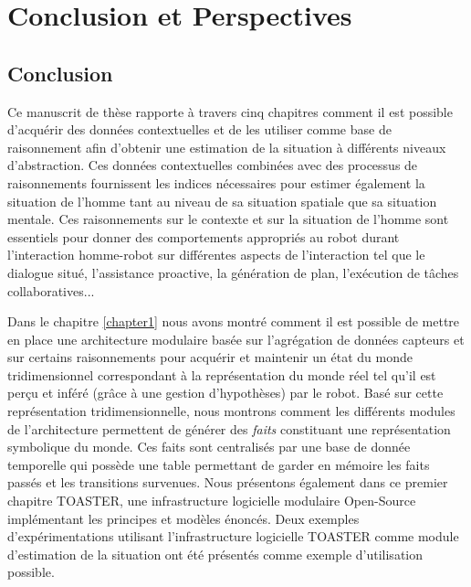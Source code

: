 \documentclass[a4paper,11pt,twoside]{StyleThese}
\begin{document}
\setcounter{chapter}{6} %
\dominitoc
\faketableofcontents
\fi

\chapter{Conclusion et Perspectives}

\section{Conclusion}
Ce manuscrit de thèse rapporte à travers cinq chapitres comment il est possible d'acquérir des données contextuelles et de les utiliser comme base de raisonnement afin d'obtenir une estimation de la situation à différents niveaux d'abstraction. Ces données contextuelles combinées avec des processus de raisonnements fournissent les indices nécessaires pour estimer également la situation de l'homme tant au niveau de sa situation spatiale que sa situation mentale. Ces raisonnements sur le contexte et sur la situation de l'homme sont essentiels pour donner des comportements appropriés au robot durant l'interaction homme-robot sur différentes aspects de l'interaction tel que le dialogue situé, l'assistance proactive, la génération de plan, l'exécution de tâches collaboratives...

Dans le chapitre \ref{chapter1} nous avons montré comment il est possible de mettre en place une architecture modulaire basée sur l'agrégation de données capteurs et sur certains raisonnements pour acquérir et maintenir un état du monde tridimensionnel correspondant à la représentation du monde réel tel qu'il est perçu et inféré (grâce à une gestion d'hypothèses) par le robot. Basé sur cette représentation tridimensionnelle, nous montrons comment les différents modules de l'architecture permettent de générer des \textit{faits} constituant une représentation symbolique du monde. Ces faits sont centralisés par une base de donnée temporelle qui possède une table permettant de garder en mémoire les faits passés et les transitions survenues. Nous présentons également dans ce premier chapitre TOASTER, une infrastructure logicielle modulaire Open-Source implémentant les principes et modèles énoncés.
Deux exemples d'expérimentations utilisant l'infrastructure logicielle TOASTER comme module d'estimation de la situation ont été présentés comme exemple d'utilisation possible.
\end{document}
